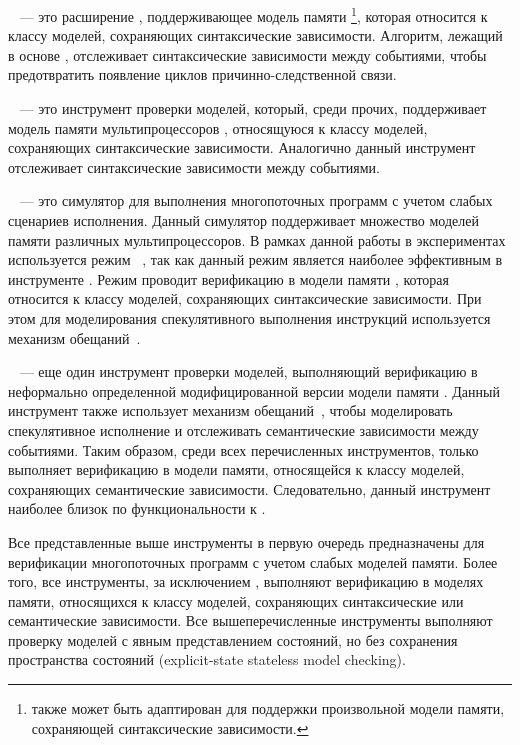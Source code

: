 \textbf{\hmc}~\cite{Kokologiannakis-Vafeiadis:ASPLOS2020} --- 
это расширение \genmc, поддерживающее модель памяти \IMM
\footnote{\hmc также может быть адаптирован для поддержки 
  произвольной модели памяти, сохраняющей синтаксические зависимости.},
которая относится к классу моделей, сохраняющих синтаксические зависимости.  
Алгоритм, лежащий в основе \hmc, отслеживает синтаксические зависимости между событиями, 
чтобы предотвратить появление циклов причинно-следственной связи. 

\textbf{\Nidhugg}~\cite{Abdulla-al:TACAS2015,Abdulla-al:CAV2016} --- 
это инструмент проверки моделей, который, среди прочих, 
поддерживает модель памяти мультипроцессоров \POWER, 
относящуюся к классу моделей, сохраняющих синтаксические зависимости.  
Аналогично \hmc данный инструмент отслеживает синтаксические зависимости между событиями.

\textbf{\rmem}~\cite{RMEM} --- 
это симулятор для выполнения многопоточных программ с учетом слабых сценариев исполнения. 
Данный симулятор поддерживает множество моделей памяти различных мультипроцессоров. 
В рамках данной работы в экспериментах используется режим \PrmARM%
~\cite{Pulte-al:PLDI2019}, так как данный режим является 
наиболее эффективным в инструменте \rmem.
Режим \PrmARM проводит верификацию в модели памяти , 
которая относится к классу моделей, сохраняющих синтаксические зависимости. 
При этом для моделирования спекулятивного выполнения инструкций 
используется механизм обещаний~\cite{Kang-al:POPL17}.  

\textbf{\CDSChecker}~\cite{Norris-Demsky:OOPSLA2013} --- 
еще один инструмент проверки моделей, выполняющий верификацию 
в неформально определенной модифицированной версии модели памяти \CMM.
Данный инструмент также использует механизм обещаний~\cite{Kang-al:POPL17}, 
чтобы моделировать спекулятивное исполнение и отслеживать
семантические зависимости между событиями. 
Таким образом, среди всех перечисленных инструментов,
только \CDSChecker выполняет верификацию в модели памяти, 
относящейся к классу моделей, сохраняющих семантические зависимости. 
Следовательно, данный инструмент наиболее близок по функциональности к \wmc.

Все представленные выше инструменты в первую очередь предназначены 
для верификации многопоточных программ с учетом слабых моделей памяти. 
Более того, все инструменты, за исключением \genmc, выполняют верификацию 
в моделях памяти, относящихся к классу моделей, 
сохраняющих синтаксические или семантические зависимости. 
Все вышеперечисленные инструменты выполняют проверку 
моделей с явным представлением состояний, 
но без сохранения пространства состояний (explicit-state stateless model checking). 

